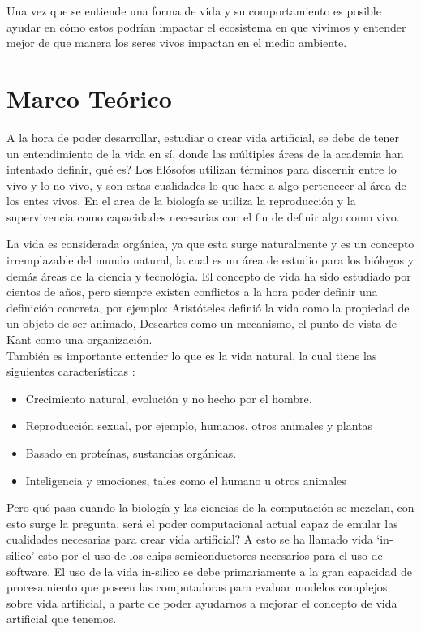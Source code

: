 \documentclass[conference]{IEEEtran}
\begin{document}
Una vez que se entiende una forma de vida y su comportamiento es posible ayudar en c\'omo estos podr\'ian impactar el ecosistema en que vivimos y entender mejor de que manera los seres vivos impactan en el medio ambiente.



\section{Marco Te\'orico}



A la hora de poder desarrollar, estudiar o crear vida artificial, se debe de tener un entendimiento de la vida en s\'i, donde las m\'ultiples \'areas de la academia han intentado definir, qu\'e es? Los fil\'osofos utilizan t\'erminos para discernir entre lo vivo y lo no-vivo, y son estas cualidades lo que hace a algo pertenecer al \'area de los entes vivos. \cite{lifeStanfordPhi} En el area de la biolog\'ia se utiliza la reproducci\'on y la supervivencia \cite{artificiallifeLevy} como capacidades necesarias con el fin de definir algo como vivo. 

La vida es considerada org\'anica, ya que esta surge naturalmente y es un concepto irremplazable del mundo natural, la cual es un \'area de estudio para los bi\'ologos y dem\'as \'areas de la ciencia y tecnol\'ogia. El concepto de vida ha sido estudiado por cientos de a\~nos, pero siempre existen conflictos a la hora poder definir una definici\'on concreta, por ejemplo: Arist\'oteles defini\'o la vida como la propiedad de un objeto de ser animado, Descartes como un mecanismo, el punto de vista de Kant como una organizaci\'on. \cite{lifeStanfordPhi} \\
Tambi\'en es importante entender lo que es la vida natural, la cual tiene las siguientes caracter\'isticas \cite{XUY01}:
\begin{itemize}
\item Crecimiento natural, evoluci\'on y no hecho por el hombre.
\item Reproducci\'on sexual, por ejemplo, humanos, otros animales y plantas
\item Basado en prote\'inas, sustancias org\'anicas.
\item Inteligencia y emociones, tales como el humano u otros animales
\end{itemize}

Pero qu\'e pasa cuando la biolog\'ia y las ciencias de la computaci\'on se mezclan, con esto surge la pregunta, ser\'a el poder computacional actual capaz de emular las cualidades necesarias para crear vida artificial? A esto se ha llamado vida `in-silico' \cite{artificiallifeLevy, lifeStanfordPhi} esto por el uso de los chips semiconductores necesarios para el uso de software. El uso de la vida in-silico se debe primariamente a la gran capacidad de procesamiento que poseen las computadoras para evaluar modelos complejos sobre vida artificial, a parte de poder ayudarnos a mejorar el concepto de vida artificial que tenemos. 
\end{document}
